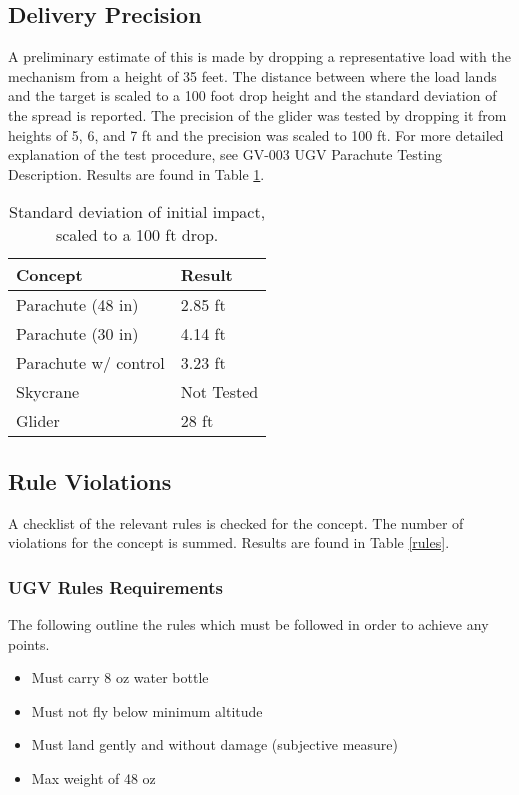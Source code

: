 \documentclass[]{auvsi_doc}
\begin{document}
	\subsection{Delivery Precision}

	A preliminary estimate of this is made by dropping a representative load with the mechanism from a height of 35 feet. The distance between where the load lands and the target is scaled to a 100 foot drop height and the standard deviation of the spread is reported. The precision of the glider was tested by dropping it from heights of 5, 6, and 7 ft and the precision was scaled to 100 ft. For more detailed explanation of the test procedure, see GV-003 UGV Parachute Testing Description. Results are found in Table \ref{precision}.

	\begin{table}[!h]
	\centering

	\caption{Standard deviation of initial impact, scaled to a 100 ft drop.}
	\label{precision}
	\begin{tabular}{|l|l|}
		\hline
		\textbf{Concept}       & \textbf{Result} \\
		\hline
		Parachute (48 in)              &        2.85 ft        \\
		Parachute (30 in)		& 4.14 ft	\\
		Parachute w/ control   &      3.23 ft           \\
		Skycrane               &            Not Tested    \\
		Glider                 &		28 ft		 \\
		\hline
	\end{tabular}
	\end{table}

	\subsection{Rule Violations}


	A checklist of the relevant rules is checked for the concept. The number of violations for the concept is summed. Results are found in Table \ref{rules}.

\subsubsection{UGV Rules Requirements}
The following outline the rules which must be followed in order to achieve any points. 
\begin{itemize}
\item Must carry 8 oz water bottle
\item Must not fly below minimum altitude
\item Must land gently and without damage (subjective measure)
\item Max weight of 48 oz
\end{itemize}
\end{document}
